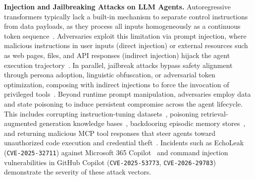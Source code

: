 \noindent
\textbf{Injection and Jailbreaking Attacks on LLM Agents.}
Autoregressive transformers typically lack a built-in mechanism to separate
control instructions from data payloads, as they process all inputs
homogeneously as a continuous token
sequence~\cite{perez-ribeiro,greshake}.
Adversaries exploit this
limitation via prompt injection, where malicious instructions in user
inputs (direct injection) or external resources such as web pages,
files, and API responses (indirect injection) hijack the agent
execution trajectory~\cite{perez-ribeiro,greshake,injecagent,
tensortrust}. In parallel, jailbreak attacks bypass safety alignment
through persona adoption, linguistic obfuscation, or adversarial token
optimization, composing with indirect injections to force the
invocation of privileged tools~\cite{wei-jailbroken,zou-gcg,shen-dan}.
Beyond runtime prompt manipulation, adversaries employ data and state
poisoning to induce persistent compromise across the agent lifecycle.
This includes corrupting instruction-tuning
datasets~\cite{wan-poisoning}, poisoning retrieval-augmented
generation knowledge bases~\cite{poisonedrag,ragroll}, backdooring
episodic memory stores~\cite{agentpoison,asb}, and returning malicious
MCP tool responses that steer agents toward unauthorized code
execution and credential
theft~\cite{mcpsafetyaudit,mcpfirstglance,toolsword}. Incidents such as
EchoLeak (\texttt{CVE-2025-32711}) against Microsoft 365
Copilot~\cite{cve202532711,echoleak} and command injection
vulnerabilities in GitHub Copilot (\texttt{CVE-2025-53773},
\texttt{CVE-2026-29783})~\cite{cve202553773,cve202629783} demonstrate
the severity of these attack vectors.


